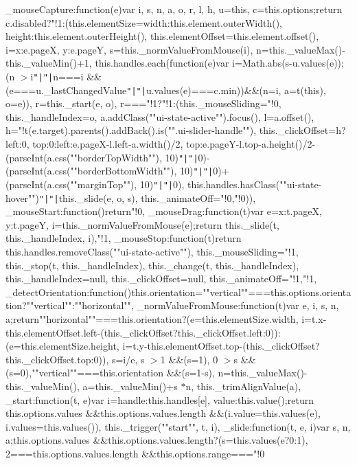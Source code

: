 {\+\_\+mouse\+Capture\+:function(e)\lcurly{}var i, s, n, a, o, r, l, h, u=this, c=this.\+options;return c.\+disabled?"!1\+:(this.\+element\+Size=\lcurly{}width\+:this.\+element.\+outer\+Width(), height\+:this.\+element.\+outer\+Height()\rcurly{}, this.\+element\+Offset=this.\+element.\+offset(), i=\lcurly{}x\+:e.\+page\+X, y\+:e.\+pageY\rcurly{}, s=this.\+\_\+norm\+Value\+From\+Mouse(i), n=this.\+\_\+value\+Max()-\/this.\+\_\+value\+Min()+1, this.\+handles.\+each(function(e)\lcurly{}var i=\+Math.\+abs(s-\/u.\+values(e));(n $>$i\texttt{"|}\texttt{"|}n===i \&\&(e===u.\+\_\+last\+Changed\+Value\texttt{"|}\texttt{"|}u.\+values(e)===c.\+min))\&\&(n=i, a=t(this), o=e)\rcurly{}), r=this.\+\_\+start(e, o), r==="!1?"!1\+:(this.\+\_\+mouse\+Sliding="!0, this.\+\_\+handle\+Index=o, a.\+add\+Class(""ui-\/state-\/active"").\+focus(), l=a.\+offset(), h="!t(e.\+target).\+parents().\+add\+Back().\+is("".\+ui-\/slider-\/handle""), this.\+\_\+click\+Offset=h?\lcurly{}left\+:0, top\+:0\rcurly{}\+:\lcurly{}left\+:e.\+page\+X-\/l.\+left-\/a.\+width()/2, top\+:e.\+page\+Y-\/l.\+top-\/a.\+height()/2-\/(parse\+Int(a.\+css(""border\+Top\+Width""), 10)\texttt{"|}\texttt{"|}0)-\/(parse\+Int(a.\+css(""border\+Bottom\+Width""), 10)\texttt{"|}\texttt{"|}0)+(parse\+Int(a.\+css(""margin\+Top""), 10)\texttt{"|}\texttt{"|}0)\rcurly{}, this.\+handles.\+has\+Class(""ui-\/state-\/hover"")\texttt{"|}\texttt{"|}this.\+\_\+slide(e, o, s), this.\+\_\+animate\+Off="!0,"!0))\rcurly{}, \+\_\+mouse\+Start\+:function()\lcurly{}return"!0\rcurly{}, \+\_\+mouse\+Drag\+:function(t)\lcurly{}var e=\lcurly{}x\+:t.\+page\+X, y\+:t.\+pageY\rcurly{}, i=this.\+\_\+norm\+Value\+From\+Mouse(e);return this.\+\_\+slide(t, this.\+\_\+handle\+Index, i),"!1\rcurly{}, \+\_\+mouse\+Stop\+:function(t)\lcurly{}return this.\+handles.\+remove\+Class(""ui-\/state-\/active""), this.\+\_\+mouse\+Sliding="!1, this.\+\_\+stop(t, this.\+\_\+handle\+Index), this.\+\_\+change(t, this.\+\_\+handle\+Index), this.\+\_\+handle\+Index=null, this.\+\_\+click\+Offset=null, this.\+\_\+animate\+Off="!1,"!1\rcurly{}, \+\_\+detect\+Orientation\+:function()\lcurly{}this.\+orientation=""vertical""===this.\+options.\+orientation?""vertical""\+:""horizontal""\rcurly{}, \+\_\+norm\+Value\+From\+Mouse\+:function(t)\lcurly{}var e, i, s, n, a;return""horizontal""===this.\+orientation?(e=this.\+element\+Size.\+width, i=t.\+x-\/this.\+element\+Offset.\+left-\/(this.\+\_\+click\+Offset?this.\+\_\+click\+Offset.\+left\+:0))\+:(e=this.\+element\+Size.\+height, i=t.\+y-\/this.\+element\+Offset.\+top-\/(this.\+\_\+click\+Offset?this.\+\_\+click\+Offset.\+top\+:0)), s=i/e, s $>$1 \&\&(s=1), 0 $>$s \&\&(s=0),""vertical""===this.\+orientation \&\&(s=1-\/s), n=this.\+\_\+value\+Max()-\/this.\+\_\+value\+Min(), a=this.\+\_\+value\+Min()+s $\ast$n, this.\+\_\+trim\+Align\+Value(a)\rcurly{}, \+\_\+start\+:function(t, e)\lcurly{}var i=\lcurly{}handle\+:this.\+handles[e], value\+:this.\+value()\rcurly{};return this.\+options.\+values \&\&this.\+options.\+values.\+length \&\&(i.\+value=this.\+values(e), i.\+values=this.\+values()), this.\+\_\+trigger(""start"", t, i)\rcurly{}, \+\_\+slide\+:function(t, e, i)\lcurly{}var s, n, a;this.\+options.\+values \&\&this.\+options.\+values.\+length?(s=this.\+values(e?0\+:1), 2===this.\+options.\+values.\+length \&\&this.\+options.\+range==="!0 }
